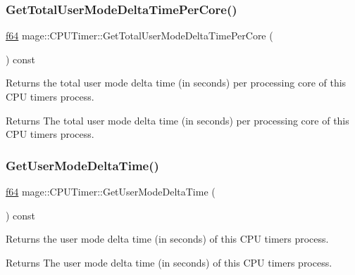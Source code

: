 \subsubsection{\texorpdfstring{Get\+Total\+User\+Mode\+Delta\+Time\+Per\+Core()}{GetTotalUserModeDeltaTimePerCore()}}
{\footnotesize\ttfamily \hyperlink{namespacemage_ab935747c6941320bd6214b5a5f265b09}{f64} mage\+::\+C\+P\+U\+Timer\+::\+Get\+Total\+User\+Mode\+Delta\+Time\+Per\+Core (\begin{DoxyParamCaption}{ }\end{DoxyParamCaption}) const\hspace{0.3cm}{\ttfamily [noexcept]}}

Returns the total user mode delta time (in seconds) per processing core of this C\+PU timer\textquotesingle{}s process.

\begin{DoxyReturn}{Returns}
The total user mode delta time (in seconds) per processing core of this C\+PU timer\textquotesingle{}s process. 
\end{DoxyReturn}
\hypertarget{classmage_1_1_c_p_u_timer_a8bbd3c5f38ad02ecb9f907a958c4c426}{}\label{classmage_1_1_c_p_u_timer_a8bbd3c5f38ad02ecb9f907a958c4c426} 
\subsubsection{\texorpdfstring{Get\+User\+Mode\+Delta\+Time()}{GetUserModeDeltaTime()}}
{\footnotesize\ttfamily \hyperlink{namespacemage_ab935747c6941320bd6214b5a5f265b09}{f64} mage\+::\+C\+P\+U\+Timer\+::\+Get\+User\+Mode\+Delta\+Time (\begin{DoxyParamCaption}{ }\end{DoxyParamCaption}) const\hspace{0.3cm}{\ttfamily [noexcept]}}

Returns the user mode delta time (in seconds) of this C\+PU timer\textquotesingle{}s process.

\begin{DoxyReturn}{Returns}
The user mode delta time (in seconds) of this C\+PU timer\textquotesingle{}s process. 
\end{DoxyReturn}
\hypertarget{classmage_1_1_c_p_u_timer_a9fc805a48140bec856b5bfe757299644}{}\label{classmage_1_1_c_p_u_timer_a9fc805a48140bec856b5bfe757299644} 
